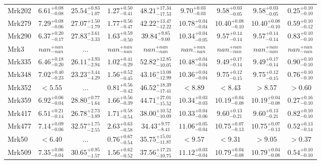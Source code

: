 \documentclass[onecolumn]{mn2e}
\begin{document}
{\begin{center}
\begin{longtable}{lcccccccc}
Mrk202 & $6.61_{-0.08}^{+0.08}$ & $25.54_{-1.07}^{+0.83}$ & $1.27_{-0.41}^{+0.50}$ &$48.21_{-17.53}^{+17.34}$ & $9.70_{-0.03}^{+0.03}$ & $9.58_{-0.05}^{+0.03}$ & $9.58_{-0.05}^{+0.03}$ & $0.25_{-0.10}^{+0.10}$ \\
Mrk279 & $7.29_{-0.06}^{+0.08}$ & $27.07_{-1.79}^{+1.50}$ & $1.77_{-0.47}^{+0.56}$ &$42.22_{-12.22}^{+13.47}$ & $10.78_{-0.04}^{+0.04}$ & $10.40_{-0.10}^{+0.08}$ & $10.40_{-0.10}^{+0.08}$ & $0.59_{-0.12}^{+0.10}$ \\
Mrk290 & $6.37_{-0.17}^{+0.20}$ & $27.83_{-3.33}^{+3.61}$ & $1.63_{-0.50}^{+0.59}$ &$39.84_{-9.00}^{+9.85}$ & $10.34_{-0.05}^{+0.04}$ & $9.57_{-0.14}^{+0.14}$ & $9.57_{-0.14}^{+0.14}$ & $0.83_{-0.10}^{+0.10}$ \\
Mrk3 & $nan_{-nan}^{+nan}$ & ... & $nan_{-nan}^{+nan}$ &$nan_{-nan}^{+nan}$ & $nan_{-nan}^{+nan}$ & $nan_{-nan}^{+nan}$ & $nan_{-nan}^{+nan}$ & $nan_{-nan}^{+nan}$ \\
Mrk335 & $6.46_{-0.20}^{+0.18}$ & $26.11_{-2.94}^{+3.93}$ & $1.02_{-0.29}^{+0.41}$ &$52.82_{-10.05}^{+12.85}$ & $10.48_{-0.04}^{+0.04}$ & $9.49_{-0.14}^{+0.17}$ & $9.49_{-0.14}^{+0.17}$ & $0.90_{-0.10}^{+0.10}$ \\
Mrk348 & $7.02_{-0.23}^{+0.40}$ & $23.23_{-4.29}^{+3.44}$ & $1.56_{-0.45}^{+0.52}$ &$43.16_{-12.99}^{+13.08}$ & $10.36_{-0.04}^{+0.04}$ & $9.75_{-0.15}^{+0.12}$ & $9.75_{-0.15}^{+0.12}$ & $0.76_{-0.10}^{+0.10}$ \\
Mrk352 & $<5.55$ & ... & $0.81_{-0.42}^{+0.56}$ &$46.52_{-17.41}^{+18.39}$ & $<8.89$ & $<8.43$ & $>8.57$ & $>0.60$ \\
Mrk359 & $6.92_{-0.04}^{+0.06}$ & $28.80_{-1.64}^{+0.77}$ & $1.66_{-0.39}^{+0.56}$ &$44.71_{-15.52}^{+27.01}$ & $10.34_{-0.03}^{+0.03}$ & $10.19_{-0.08}^{+0.04}$ & $10.19_{-0.08}^{+0.04}$ & $0.27_{-0.10}^{+0.16}$ \\
Mrk417 & $6.51_{-0.14}^{+0.21}$ & $26.78_{-3.89}^{+2.73}$ & $1.71_{-0.54}^{+0.58}$ &$38.00_{-10.09}^{+10.52}$ & $10.33_{-0.06}^{+0.04}$ & $9.60_{-0.21}^{+0.13}$ & $9.60_{-0.21}^{+0.13}$ & $0.82_{-0.10}^{+0.10}$ \\
Mrk477 & $7.14_{-0.06}^{+0.09}$ & $32.57_{-2.55}^{+1.75}$ & $2.63_{-0.58}^{+0.63}$ &$34.43_{-8.41}^{+9.77}$ & $11.06_{-0.04}^{+0.05}$ & $10.75_{-0.13}^{+0.07}$ & $10.75_{-0.13}^{+0.07}$ & $0.52_{-0.14}^{+0.13}$ \\
Mrk50 & $<6.40$ & ... & $0.76_{-0.54}^{+0.67}$ &$35.75_{-11.87}^{+15.01}$ & $<9.57$ & $<9.31$ & $>9.05$ & $>0.37$ \\
Mrk509 & $7.35_{-0.04}^{+0.06}$ & $30.65_{-1.57}^{+0.95}$ & $1.56_{-0.52}^{+0.62}$ &$37.56_{-10.75}^{+17.21}$ & $11.12_{-0.04}^{+0.03}$ & $10.79_{-0.08}^{+0.04}$ & $10.79_{-0.08}^{+0.04}$ & $0.54_{-0.10}^{+0.10}$ \\

\end{longtable}
\end{center}}
\end{document}

